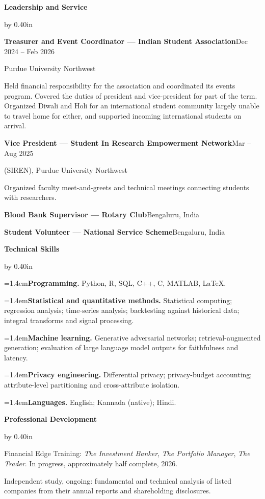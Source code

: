\documentclass[10pt]{article}
\newcommand{\cvsection}[1]{%
  \vspace{8pt}%
  {\fontsize{11pt}{13pt}\selectfont\textbf{#1}}%
  \par\nobreak\vspace{4pt}%
}
\newenvironment{cvindent}{\par\advance\leftskip by 0.40in}{\par}
\newcommand{\cvrow}[2]{\noindent #1\hfill #2\par}
\newcommand{\cvdesc}[1]{\par #1\par\vspace{5.5pt}}
\newcommand{\cvline}[1]{\par\noindent #1\par\vspace{4pt}}
\newcommand{\cvlab}[2]{\par\noindent\hangindent=1.4em\hangafter=1\textbf{#1} #2\par\vspace{4pt}}
\begin{document}
\cvsection{Leadership and Service}
\begin{cvindent}

\cvrow{\textbf{Treasurer and Event Coordinator --- Indian Student Association}}{Dec 2024 -- Feb 2026}
\cvrow{Purdue University Northwest}{}
\cvdesc{Held financial responsibility for the association and coordinated its events program. Covered
the duties of president and vice-president for part of the term. Organized Diwali and Holi for an
international student community largely unable to travel home for either, and supported incoming
international students on arrival.}

\cvrow{\textbf{Vice President --- Student In Research Empowerment Network}}{Mar -- Aug 2025}
\cvrow{(SIREN), Purdue University Northwest}{}
\cvdesc{Organized faculty meet-and-greets and technical meetings connecting students with researchers.}

\cvrow{\textbf{Blood Bank Supervisor --- Rotary Club}}{Bengaluru, India}
\vspace{5.5pt}

\cvrow{\textbf{Student Volunteer --- National Service Scheme}}{Bengaluru, India}
\end{cvindent}

\cvsection{Technical Skills}
\begin{cvindent}
\cvlab{Programming.}{Python, R, SQL, C++, C, MATLAB, \LaTeX.}
\cvlab{Statistical and quantitative methods.}{Statistical computing; regression analysis; time-series
analysis; backtesting against historical data; integral transforms and signal processing.}
\cvlab{Machine learning.}{Generative adversarial networks; retrieval-augmented generation; evaluation
of large language model outputs for faithfulness and latency.}
\cvlab{Privacy engineering.}{Differential privacy; privacy-budget accounting; attribute-level
partitioning and cross-attribute isolation.}
\cvlab{Languages.}{English; Kannada (native); Hindi.}
\end{cvindent}

\cvsection{Professional Development}
\begin{cvindent}
\cvline{Financial Edge Training: \emph{The Investment Banker}, \emph{The Portfolio Manager},
\emph{The Trader}. In progress, approximately half complete, 2026.}
\cvline{Independent study, ongoing: fundamental and technical analysis of listed companies from their
annual reports and shareholding disclosures.}
\end{cvindent}
\end{document}
